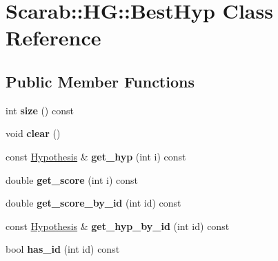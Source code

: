 \hypertarget{classScarab_1_1HG_1_1BestHyp}{
\section{Scarab::HG::BestHyp Class Reference}
\label{classScarab_1_1HG_1_1BestHyp}
}
\subsection*{Public Member Functions}
\begin{DoxyCompactItemize}
\item 
\hypertarget{classScarab_1_1HG_1_1BestHyp_a8ebb56ed4cd363e793bc13936551a58a}{
int {\bfseries size} () const }
\label{classScarab_1_1HG_1_1BestHyp_a8ebb56ed4cd363e793bc13936551a58a}

\item 
\hypertarget{classScarab_1_1HG_1_1BestHyp_a3c032ac35ce142d64fdad17b8950b493}{
void {\bfseries clear} ()}
\label{classScarab_1_1HG_1_1BestHyp_a3c032ac35ce142d64fdad17b8950b493}

\item 
\hypertarget{classScarab_1_1HG_1_1BestHyp_a33ebfb0c6fc093b02e8d2e33082fd8a9}{
const \hyperlink{structScarab_1_1HG_1_1Hypothesis}{Hypothesis} \& {\bfseries get\_\-hyp} (int i) const }
\label{classScarab_1_1HG_1_1BestHyp_a33ebfb0c6fc093b02e8d2e33082fd8a9}

\item 
\hypertarget{classScarab_1_1HG_1_1BestHyp_afd75d0946faf6a48d113d815c1f86bce}{
double {\bfseries get\_\-score} (int i) const }
\label{classScarab_1_1HG_1_1BestHyp_afd75d0946faf6a48d113d815c1f86bce}

\item 
\hypertarget{classScarab_1_1HG_1_1BestHyp_a60998ae47c3087d809d0ab1be0d2c21a}{
double {\bfseries get\_\-score\_\-by\_\-id} (int id) const }
\label{classScarab_1_1HG_1_1BestHyp_a60998ae47c3087d809d0ab1be0d2c21a}

\item 
\hypertarget{classScarab_1_1HG_1_1BestHyp_ad68702666a75575acffd113f9038e92a}{
const \hyperlink{structScarab_1_1HG_1_1Hypothesis}{Hypothesis} \& {\bfseries get\_\-hyp\_\-by\_\-id} (int id) const }
\label{classScarab_1_1HG_1_1BestHyp_ad68702666a75575acffd113f9038e92a}

\item 
\hypertarget{classScarab_1_1HG_1_1BestHyp_acdb194cd10fe47e64ac7c96de296cb4e}{
bool {\bfseries has\_\-id} (int id) const }
\label{classScarab_1_1HG_1_1BestHyp_acdb194cd10fe47e64ac7c96de296cb4e}


\end{DoxyCompactItemize}

